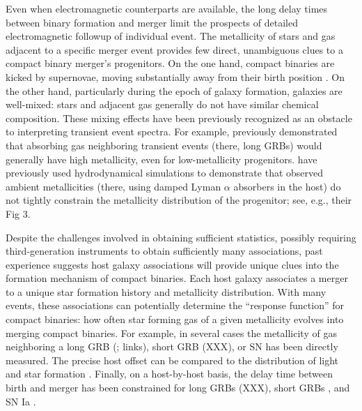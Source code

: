\documentclass[nofootinbib,twocolumn,prd]{emulateapj}
\newcommand\editremark[1]{{\color{red}#1}}
\begin{document}
Even when electromagnetic counterparts are available, the long delay times between binary formation and merger limit
the prospects of detailed electromagnetic followup of individual event. 
The metallicity of stars and gas adjacent to a specific merger event provides
few direct, unambiguous clues to a compact binary merger's progenitors.  
On the one hand, compact binaries are kicked by supernovae, moving substantially away from their birth position
\cite{2013ApJ...776...18F,2014ARAA..52...43B}. 
On the other hand, particularly during the epoch of galaxy formation, galaxies are well-mixed: stars and adjacent gas generally do not have
similar chemical composition.  
These mixing effects have been previously recognized as an obstacle to interpreting transient event spectra.  For
example,   \cite{2010MNRAS.402.1523P} previously demonstrated that absorbing gas neighboring transient events (there, long GRBs)
would generally have high metallicity, even for low-metallicity progenitors.   
%
\citet{2010MNRAS.402.1523P} have previously used hydrodynamical simulations to demonstrate that observed ambient
metallicities (there, using damped Lyman $\alpha$ absorbers in the host) do not tightly constrain the metallicity
distribution of the progenitor; see, e.g., their Fig 3.
%


Despite the challenges involved in obtaining sufficient statistics, possibly requiring third-generation instruments to
obtain sufficiently many associations, past experience suggests  host galaxy associations
will provide unique clues into the formation mechanism of compact binaries.
% 
Each host galaxy associates a merger to a unique star formation history and metallicity distribution.
With many events, these associations can potentially determine the ``response function'' for compact binaries: how often star forming gas of a given metallicity evolves into
merging compact binaries.    
%
For example, in several cases the metallicity of gas neighboring a long GRB (\citet{ 2008AJ....135.1136M}; \citet{2010AJ....140.1557L}
\editremark{links}), short GRB (\editremark{XXX}), or SN has been directly measured.
%
The precise host offset can be compared to the distribution of light and star formation  \citep{2010ApJ...708....9F}.
%
Finally,  on a host-by-host basis, the delay time between birth and merger has been constrained for long GRBs (\editremark{XXX}), short GRBs \citep{2010ApJ...725.1202L}, and
  SN Ia \citep{2011MNRAS.412.1508M}.  
%
\end{document}
